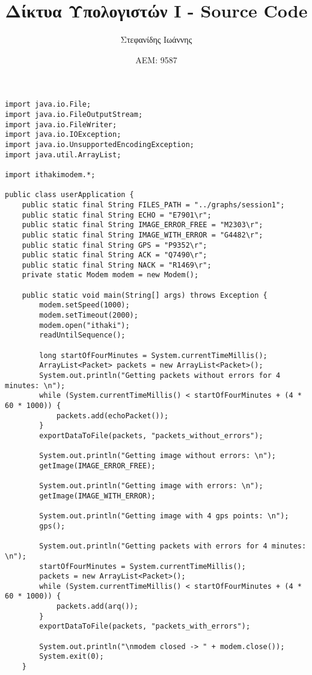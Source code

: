 \documentclass{article}
\title{Δίκτυα Υπολογιστών Ι - Source Code}
\author{Στεφανίδης Ιωάννης}
\date{ΑΕΜ: 9587}
\begin{document}
\maketitle

\begin{verbatim}
import java.io.File;
import java.io.FileOutputStream;
import java.io.FileWriter;
import java.io.IOException;
import java.io.UnsupportedEncodingException;
import java.util.ArrayList;

import ithakimodem.*;

public class userApplication {
    public static final String FILES_PATH = "../graphs/session1";
    public static final String ECHO = "E7901\r";
    public static final String IMAGE_ERROR_FREE = "M2303\r";
    public static final String IMAGE_WITH_ERROR = "G4482\r";
    public static final String GPS = "P9352\r";
    public static final String ACK = "Q7490\r";
    public static final String NACK = "R1469\r";
    private static Modem modem = new Modem();

    public static void main(String[] args) throws Exception {
        modem.setSpeed(1000);
        modem.setTimeout(2000);
        modem.open("ithaki");
        readUntilSequence();

        long startOfFourMinutes = System.currentTimeMillis();
        ArrayList<Packet> packets = new ArrayList<Packet>();
        System.out.println("Getting packets without errors for 4 minutes: \n");
        while (System.currentTimeMillis() < startOfFourMinutes + (4 * 60 * 1000)) {
            packets.add(echoPacket());
        }
        exportDataToFile(packets, "packets_without_errors");

        System.out.println("Getting image without errors: \n");
        getImage(IMAGE_ERROR_FREE);

        System.out.println("Getting image with errors: \n");
        getImage(IMAGE_WITH_ERROR);

        System.out.println("Getting image with 4 gps points: \n");
        gps();

        System.out.println("Getting packets with errors for 4 minutes: \n");
        startOfFourMinutes = System.currentTimeMillis();
        packets = new ArrayList<Packet>();
        while (System.currentTimeMillis() < startOfFourMinutes + (4 * 60 * 1000)) {
            packets.add(arq());
        }
        exportDataToFile(packets, "packets_with_errors");

        System.out.println("\nmodem closed -> " + modem.close());
        System.exit(0);
    }


\end{verbatim}
\end{document}
